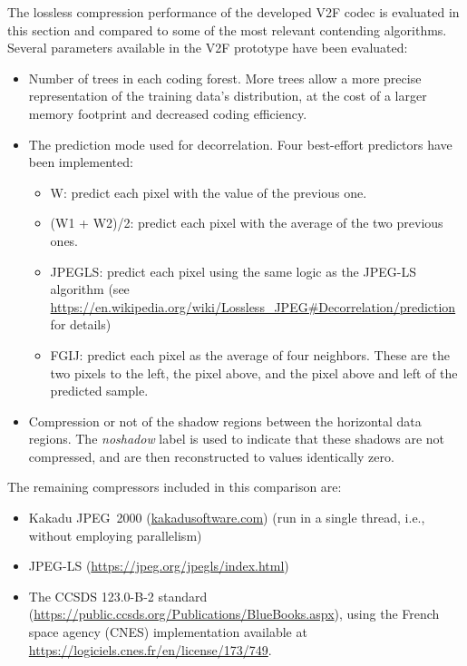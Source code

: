 \documentclass{class/technicalReportUAB}
\begin{document}
The lossless compression performance of the developed V2F codec is evaluated in this section and compared to some of the most relevant contending algorithms.
% 
Several parameters available in the V2F prototype have been evaluated:
\begin{itemize}
 \item Number of trees in each coding forest. More trees allow a more precise representation of the training data's distribution, at the cost of a larger
       memory footprint and decreased coding efficiency.
 \item The prediction mode used for decorrelation. Four best-effort predictors have been implemented:
    \begin{itemize}
    \item W: predict each pixel with the value of the previous one.
    \item (W1 + W2)/2: predict each pixel with the average of the two previous ones.
    \item JPEGLS: predict each pixel using the same logic as the JPEG-LS algorithm (see \url{https://en.wikipedia.org/wiki/Lossless_JPEG#Decorrelation/prediction} for details)
    \item FGIJ: predict each pixel as the average of four neighbors. These are the two pixels to the left, the pixel above, and the pixel above and left of the predicted sample.
    \end{itemize}
 \item Compression or not of the shadow regions between the horizontal data regions. The \textit{noshadow} label is used to indicate that these shadows are not compressed,
       and are then reconstructed to values identically zero.
\end{itemize}
% 
The remaining compressors included in this comparison are:
\begin{itemize}
 \item Kakadu JPEG~2000 (\url{kakadusoftware.com}) (run in a single thread, i.e., without employing parallelism)
 \item JPEG-LS (\url{https://jpeg.org/jpegls/index.html})
 \item The CCSDS 123.0-B-2 standard (\url{https://public.ccsds.org/Publications/BlueBooks.aspx}), using the French space agency (CNES)
       implementation available at \url{https://logiciels.cnes.fr/en/license/173/749}.
\end{itemize}
\end{document}
